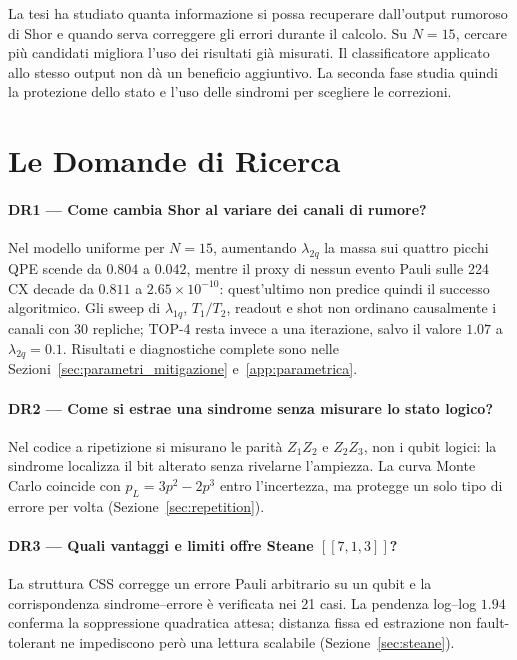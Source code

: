\begin{onehalfspace}

La tesi ha studiato quanta informazione si possa recuperare dall'output rumoroso di Shor e quando serva correggere gli errori durante il calcolo. Su $N=15$, cercare più candidati migliora l'uso dei risultati già misurati. Il classificatore applicato allo stesso output non dà un beneficio aggiuntivo. La seconda fase studia quindi la protezione dello stato e l'uso delle sindromi per scegliere le correzioni.

\section{Le Domande di Ricerca}
\label{sec:risposte_dr}

\paragraph{DR1 --- Come cambia Shor al variare dei canali di rumore?}
Nel modello uniforme per $N=15$, aumentando $\lambda_{2q}$ la massa sui quattro
picchi QPE scende da $0.804$ a $0.042$, mentre il proxy di nessun evento Pauli
sulle 224 CX decade da $0.811$ a $2.65\times10^{-10}$: quest'ultimo non predice
quindi il successo algoritmico. Gli sweep di $\lambda_{1q}$, $T_1/T_2$, readout
e shot non ordinano causalmente i canali con 30 repliche; TOP-4 resta invece a
una iterazione, salvo il valore $1.07$ a $\lambda_{2q}=0.1$. Risultati e
diagnostiche complete sono nelle Sezioni~\ref{sec:parametri_mitigazione}
e~\ref{app:parametrica}.

\paragraph{DR2 --- Come si estrae una sindrome senza misurare lo stato logico?}
Nel codice a ripetizione si misurano le parità $Z_1Z_2$ e $Z_2Z_3$, non i qubit
logici: la sindrome localizza il bit alterato senza rivelarne l'ampiezza. La
curva Monte Carlo coincide con $p_L=3p^2-2p^3$ entro l'incertezza, ma protegge
un solo tipo di errore per volta (Sezione~\ref{sec:repetition}).

\paragraph{DR3 --- Quali vantaggi e limiti offre Steane $[[7,1,3]]$?}
La struttura CSS corregge un errore Pauli arbitrario su un qubit e la
corrispondenza sindrome--errore è verificata nei 21 casi. La pendenza log--log
$1.94$ conferma la soppressione quadratica attesa; distanza fissa ed estrazione
non fault-tolerant ne impediscono però una lettura scalabile
(Sezione~\ref{sec:steane}).


\end{onehalfspace}
